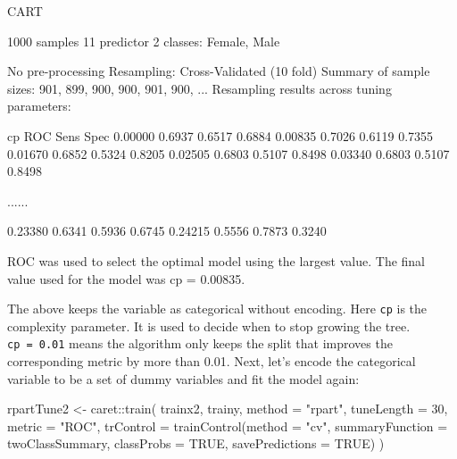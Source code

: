 \documentclass[
  12pt,
]{krantz}
\makeatletter
\newenvironment{Shaded}{\begin{snugshade}}{\end{snugshade}}
\newcommand{\AttributeTok}[1]{\textcolor[rgb]{0.61,0.61,0.61}{#1}}
\newcommand{\ConstantTok}[1]{\textcolor[rgb]{0,0,0}{#1}}
\newcommand{\DecValTok}[1]{\textcolor[rgb]{0.06,0.06,0.06}{#1}}
\newcommand{\FunctionTok}[1]{\textcolor[rgb]{0,0,0}{#1}}
\newcommand{\NormalTok}[1]{#1}
\newcommand{\OtherTok}[1]{\textcolor[rgb]{0.37,0.37,0.37}{#1}}
\newcommand{\SpecialCharTok}[1]{\textcolor[rgb]{0,0,0}{#1}}
\newcommand{\StringTok}[1]{\textcolor[rgb]{0.5,0.5,0.5}{#1}}
\newenvironment{kframe}{%
\medskip{}
\setlength{\fboxsep}{.8em}
 \def\at@end@of@kframe{}%
 \ifinner\ifhmode%
  \def\at@end@of@kframe{\end{minipage}}%
  \begin{minipage}{\columnwidth}%
 \fi\fi%
 \def\FrameCommand##1{\hskip\@totalleftmargin \hskip-\fboxsep
 \colorbox{shadecolor}{##1}\hskip-\fboxsep
     \hskip-\linewidth \hskip-\@totalleftmargin \hskip\columnwidth}%
 \MakeFramed {\advance\hsize-\width
   \@totalleftmargin\z@ \linewidth\hsize
   \@setminipage}}%
 {\par\unskip\endMakeFramed%
 \at@end@of@kframe}
\renewenvironment{Shaded}{\begin{kframe}}{\end{kframe}}
\makeatother
\begin{document}
\begin{Shaded}
\begin{Highlighting}[]
\NormalTok{CART }

\NormalTok{1000 samples}
\NormalTok{  11 predictor}
\NormalTok{   2 classes: \textquotesingle{}Female\textquotesingle{}, \textquotesingle{}Male\textquotesingle{} }

\NormalTok{No pre{-}processing}
\NormalTok{Resampling: Cross{-}Validated (10 fold) }
\NormalTok{Summary of sample sizes: 901, 899, 900, 900, 901, 900, ... }
\NormalTok{Resampling results across tuning parameters:}

\NormalTok{  cp       ROC     Sens    Spec  }
\NormalTok{  0.00000  0.6937  0.6517  0.6884}
\NormalTok{  0.00835  0.7026  0.6119  0.7355}
\NormalTok{  0.01670  0.6852  0.5324  0.8205}
\NormalTok{  0.02505  0.6803  0.5107  0.8498}
\NormalTok{  0.03340  0.6803  0.5107  0.8498}
  
\NormalTok{  ......}

\NormalTok{  0.23380  0.6341  0.5936  0.6745}
\NormalTok{  0.24215  0.5556  0.7873  0.3240}

\NormalTok{ROC was used to select the optimal model using the largest value.}
\NormalTok{The final value used for the model was cp = 0.00835.}
\end{Highlighting}
\end{Shaded}

The above keeps the variable as categorical without encoding. Here \texttt{cp} is the complexity parameter. It is used to decide when to stop growing the tree. \texttt{cp\ =\ 0.01} means the algorithm only keeps the split that improves the corresponding metric by more than 0.01. Next, let's encode the categorical variable to be a set of dummy variables and fit the model again:

\begin{Shaded}
\begin{Highlighting}[]
\NormalTok{rpartTune2 }\OtherTok{\textless{}{-}}\NormalTok{ caret}\SpecialCharTok{::}\FunctionTok{train}\NormalTok{(}
\NormalTok{  trainx2, trainy, }\AttributeTok{method =} \StringTok{"rpart"}\NormalTok{,}
  \AttributeTok{tuneLength =} \DecValTok{30}\NormalTok{,}
  \AttributeTok{metric =} \StringTok{"ROC"}\NormalTok{, }
  \AttributeTok{trControl =} \FunctionTok{trainControl}\NormalTok{(}\AttributeTok{method =} \StringTok{"cv"}\NormalTok{,}
                           \AttributeTok{summaryFunction =}\NormalTok{ twoClassSummary,}
                           \AttributeTok{classProbs =} \ConstantTok{TRUE}\NormalTok{,}
                           \AttributeTok{savePredictions =} \ConstantTok{TRUE}\NormalTok{)}
\NormalTok{  )}
\end{Highlighting}
\end{Shaded}
\end{document}
